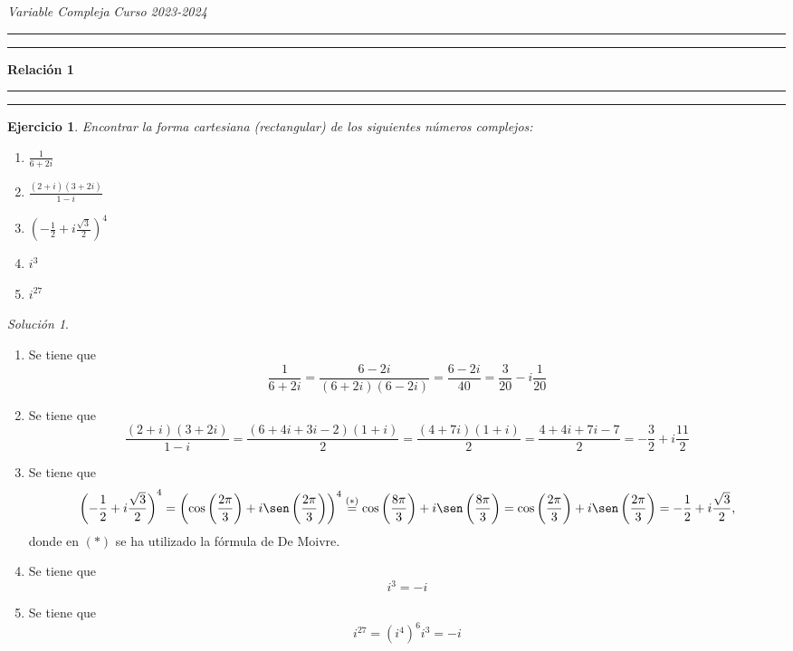 \documentclass[11pt]{report}
\newcommand{\pars}[1]{\left( #1 \right)} %
\newtheorem{exercise}{Ejercicio}
\theoremstyle{remark}
\newtheorem*{resolution}{Solución}
\begin{document}
\textit{Variable Compleja} \hfill \textit{Curso 2023-2024}

\vspace{-5mm}

\begin{center}

	\rule{\textwidth}{1.6pt}\vspace*{-\baselineskip}\vspace*{2pt} %
	\rule{\textwidth}{0.4pt} %
	
	{\LARGE \textbf{Relación 1}} %
	
	\rule[0.66\baselineskip]{\textwidth}{0.4pt}\vspace*{-\baselineskip}\vspace{3.2pt} %
	\rule[0.66\baselineskip]{\textwidth}{1.6pt} %

\end{center}

\begin{exercise}
    Encontrar la forma cartesiana (rectangular) de los siguientes números complejos:
    \begin{enumerate}
        \item $\displaystyle \frac{1}{6+2i}$
        \item $\displaystyle \frac{(2+i)(3+2i)}{1-i}$
        \item $\displaystyle \left(-\frac{1}{2}+i\frac{\sqrt{3}}{2}\right)^4$
        \item $\displaystyle i^3$
        \item $\displaystyle i^{27}$
    \end{enumerate}
\end{exercise}

\begin{resolution}
    \hfill
    \begin{enumerate}
        \item Se tiene que
        \[\frac{1}{6+2i} = \frac{6-2i}{(6+2i)(6-2i)} = \frac{6-2i}{40} = \frac{3}{20}-i\frac{1}{20}\]
        \item Se tiene que
        \[\frac{(2+i)(3+2i)}{1-i} = \frac{(6+4i+3i-2)(1+i)}{2} = \frac{(4+7i)(1+i)}{2} = \frac{4+4i+7i-7}{2} 
        = -\frac{3}{2}+i\frac{11}{2}\]
        \item Se tiene que
        \[\pars{-\frac{1}{2}+i\frac{\sqrt{3}}{2}}^4 = \pars{\cos\pars{\frac{2\pi}{3}}+i\sen\pars{\frac{2\pi}{3}}}^4 \overset{(*)}{=} \cos\pars{\frac{8\pi}{3}}+i\sen\pars{\frac{8\pi}{3}} =\cos\pars{\frac{2\pi}{3}}+i\sen\pars{\frac{2\pi}{3}}= -\frac{1}{2}+i\frac{\sqrt{3}}{2},\]
        donde en $(*)$ se ha utilizado la fórmula de De Moivre.
        \item Se tiene que
        \[i^3 = -i\]
        \item Se tiene que
        \[i^{27} = (i^4)^6 i^3 = -i\]
    \end{enumerate}
\end{resolution}
\end{document}

